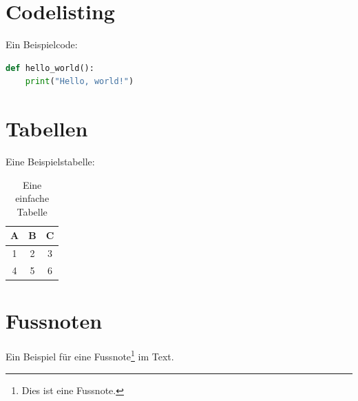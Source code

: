 \documentclass[a4paper,12pt]{article}
\begin{document}
\section{Codelisting}
Ein Beispielcode:
\begin{lstlisting}[language=Python, caption={Beispielcode in Python}]
def hello_world():
    print("Hello, world!")
\end{lstlisting}

\section{Tabellen}
\label{sec:tabellen}
Eine Beispielstabelle:
\begin{table}[h!]
\centering
\begin{tabular}{|c|c|c|}
\hline
A & B & C \\
\hline
1 & 2 & 3 \\
\hline
4 & 5 & 6 \\
\hline
\end{tabular}
\caption{Eine einfache Tabelle}
\end{table}

\section{Fussnoten}
Ein Beispiel für eine Fussnote\footnote{Dies ist eine Fussnote.} im Text.

\newpage



\newpage
\printindex
\end{document}
